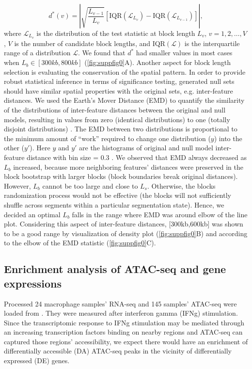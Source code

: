 \documentclass{article}
\begin{document}
$$ d^*(v)= \left| \sqrt{\frac{L_{v-1}}{L_v}} [\text{IQR}(\mathcal{L}_{L_v})-\text{IQR}(\mathcal{L}_{L_{v-1}})] \right|,$$
where $\mathcal{L}_{L_v}$ is the distribution of the test statistic at
block length $L_v$, $v = 1,2,\dots,V$, $V$ is the number of candidate
block lengths, and $\text{IQR}(\mathcal{L})$ is the interquartile
range of a distribution $\mathcal{L}$.
We found that $d^*$ had
smaller values in most cases when $L_b\in[300kb,800kb]$
(\cref{fig:suppfig0}A).
Another aspect for block length selection is evaluating the
conservation of the spatial pattern. In order to provide robust
statistical inference in terms of significance testing,
generated  null sets should have similar spatial properties with
the original sets, e.g. inter-feature distances.
We used the Earth's Mover
Distance (EMD) to quantify the similarity of the distributions of
inter-feature distances between the original and 
null models, resulting 
in values from zero (identical distributions) to one (totally disjoint
distributions) \citep{emd}.
The EMD between two distributions is proportional to
the minimum amount of ``work'' required to change one distribution ($y$)
into the other ($y'$). Here $y$ and $y'$ are the histograms of
original and 
null model inter-feature distance with bin size = 0.3 .
We observed that EMD always decreased as $L_b$ increased, because more
neighboring  features' distances were preserved in the
block bootstrap with larger blocks (block boundaries break original
distances).
However, $L_b$ cannot be too large and close to $L_s$.
Otherwise, the blocks randomization process would not
be effective (the blocks will not sufficiently shuffle across segments
within a particular segmentation state).
Hence, we decided an optimal $L_b$ falls in the range where EMD
was around elbow of the line plot. Considering this aspect of
inter-feature distances, [300kb,600kb] was
shown to be a good range by visualization of density plot
(\cref{fig:suppfig0}B) and according to the elbow of the EMD statistic
(\cref{fig:suppfig0}C).

\subsection{Enrichment analysis of ATAC-seq and gene expressions}\label{sec:splines}

Processed 24 macrophage samples' RNA-seq and 145 samples' ATAC-seq
were loaded from  \citep{lee2020fluent}. They
were measured after interferon gamma (IFNg) stimulation. Since the
transcriptomic response to IFNg stimulation may be mediated through an
increasing transcription factors binding on nearby regions and
ATAC-seq can captured those regions' accessibility, we expect there
would have an enrichment of differentially accessible (DA) ATAC-seq
peaks in the vicinity of differentially expressed (DE) genes.
\end{document}
